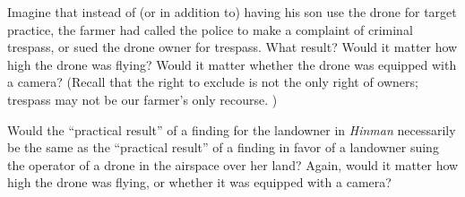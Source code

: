 Imagine that instead of (or in addition to) having his son use the drone for
target practice, the farmer had called the police to make a complaint of
criminal trespass, or sued the drone owner for trespass. What result? Would it
matter how high the drone was flying? Would it matter whether the drone was
equipped with a camera? (Recall that the right to exclude is not the only right
of owners; trespass may not be our farmer's only recourse.
)

\item Would the ``practical result'' of a finding for the landowner in
\textit{Hinman} necessarily be the same as the ``practical result'' of a
finding in favor of a landowner suing the operator of a drone in the airspace
over her land? Again, would it matter how high the drone was flying, or whether
it was equipped with a camera?

